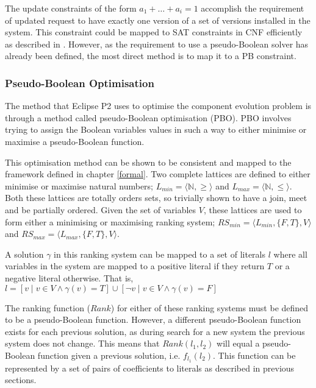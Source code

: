The update constraints of the form $a_1 + \ldots + a_i = 1$ accomplish the requirement of updated request to have exactly one version of a set of versions installed in the system.
This constraint could be mapped to SAT constraints in CNF efficiently as described in \cite{silva2007}.
However, as the requirement to use a pseudo-Boolean solver has already been defined, the most direct method is to map it to a PB constraint.

\subsubsection{Pseudo-Boolean Optimisation}
The method that Eclipse P2 uses to optimise the component evolution problem is through a method called pseudo-Boolean optimisation (PBO).
PBO involves trying to assign the Boolean variables values in such a way to either minimise or maximise a pseudo-Boolean function.

This optimisation method can be shown to be consistent and mapped to the framework defined in chapter \ref{formal}.
Two complete lattices are defined to either minimise or maximise natural numbers; $L_{min} = \langle \mathbb{N}, \geq \rangle$ and $L_{max} = \langle \mathbb{N}, \leq \rangle$.
Both these lattices are totally orders sets, so trivially shown to have a join, meet and be partially ordered.
Given the set of variables $V$, these lattices are used to form either a minimising or maximising  ranking system;
$RS_{min} = \langle L_{min}, \{F,T\}, V \rangle$ and $RS_{max} = \langle L_{max}, \{F,T\}, V \rangle$. 

A solution $\gamma$ in this ranking system can be mapped to a set of literals $l$
where all variables in the system are mapped to a positive literal if they return $T$ or a negative literal otherwise.
That is, $l = [v \mid v \in V \wedge \gamma(v) = T] \cup [\neg v \mid v \in V \wedge \gamma(v) = F]$

The ranking function ($Rank$) for either of these ranking systems must be defined to be a pseudo-Boolean function.
However, a different pseudo-Boolean function exists for each previous solution, as during search for a new system the previous system does not change.
This means that $Rank(l_1,l_2)$ will equal a pseudo-Boolean function given a previous solution, i.e. $f_{l_1}(l_2)$.
This function can be represented by a set of pairs of coefficients to literals as described in previous sections.

